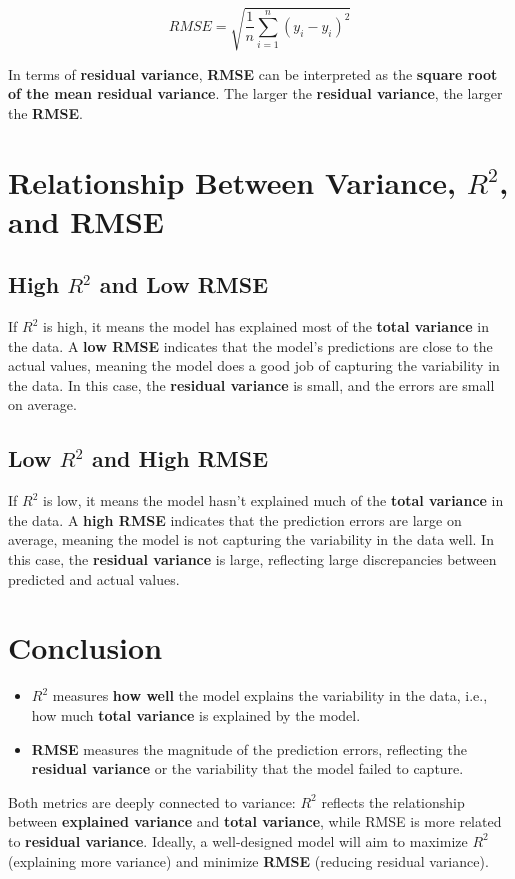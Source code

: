 \documentclass{article}
\begin{document}
\[
RMSE = \sqrt{\frac{1}{n} \sum_{i=1}^{n} (y_i - \hat{y_i})^2}
\]

In terms of \textbf{residual variance}, \textbf{RMSE} can be interpreted as the \textbf{square root of the mean residual variance}. The larger the \textbf{residual variance}, the larger the \textbf{RMSE}.

\section{Relationship Between Variance, \( R^2 \), and RMSE}
\subsection{High \( R^2 \) and Low RMSE}
If \( R^2 \) is high, it means the model has explained most of the \textbf{total variance} in the data. A \textbf{low RMSE} indicates that the model's predictions are close to the actual values, meaning the model does a good job of capturing the variability in the data. In this case, the \textbf{residual variance} is small, and the errors are small on average.

\subsection{Low \( R^2 \) and High RMSE}
If \( R^2 \) is low, it means the model hasn't explained much of the \textbf{total variance} in the data. A \textbf{high RMSE} indicates that the prediction errors are large on average, meaning the model is not capturing the variability in the data well. In this case, the \textbf{residual variance} is large, reflecting large discrepancies between predicted and actual values.

\section{Conclusion}
\begin{itemize}
    \item \( R^2 \) measures \textbf{how well} the model explains the variability in the data, i.e., how much \textbf{total variance} is explained by the model.
    \item \textbf{RMSE} measures the magnitude of the prediction errors, reflecting the \textbf{residual variance} or the variability that the model failed to capture.
\end{itemize}

Both metrics are deeply connected to variance: \( R^2 \) reflects the relationship between \textbf{explained variance} and \textbf{total variance}, while RMSE is more related to \textbf{residual variance}. Ideally, a well-designed model will aim to maximize \( R^2 \) (explaining more variance) and minimize \textbf{RMSE} (reducing residual variance).
\end{document}
